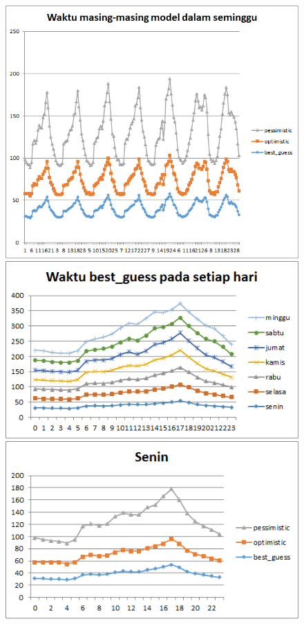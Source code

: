 \begin{figure}[H]
				\centering		
				\includegraphics[scale=0.8]{Gambar/waktuallmodelsampel215052017.png}
				\includegraphics[]{Gambar/waktubestguesssampel215052017.png}
				\includegraphics[]{Gambar/seninsampel215052017.png}
\end{figure}
			
